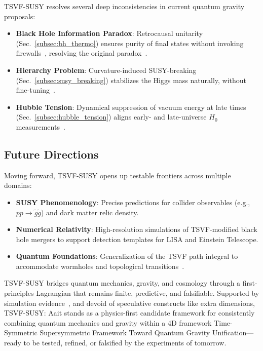 \documentclass[twocolumn,superscriptaddress,floatfix]{revtex4-2}
\begin{document}
TSVF-SUSY resolves several deep inconsistencies in current quantum gravity proposals:
\begin{itemize}
    \item \textbf{Black Hole Information Paradox}: Retrocausal unitarity (Sec.~\ref{subsec:bh_thermo}) ensures purity of final states without invoking firewalls~\cite{Almheiri2013}, resolving the original paradox~\cite{Hawking1976}.
    \item \textbf{Hierarchy Problem}: Curvature-induced SUSY-breaking (Sec.~\ref{subsec:susy_breaking}) stabilizes the Higgs mass naturally, without fine-tuning~\cite{Giudice2008}.
    \item \textbf{Hubble Tension}: Dynamical suppression of vacuum energy at late times (Sec.~\ref{subsec:hubble_tension}) aligns early- and late-universe \(H_0\) measurements~\cite{Riess2021}.
\end{itemize}

\subsection{Future Directions}
\label{subsec:future_directions}

Moving forward, TSVF-SUSY opens up testable frontiers across multiple domains:
\begin{itemize}
    \item \textbf{SUSY Phenomenology}: Precise predictions for collider observables (e.g., \(pp \to \tilde{g}\tilde{g}\)) and dark matter relic density.
    \item \textbf{Numerical Relativity}: High-resolution simulations of TSVF-modified black hole mergers to support detection templates for LISA and Einstein Telescope.
    \item \textbf{Quantum Foundations}: Generalization of the TSVF path integral to accommodate wormholes and topological transitions~\cite{Maldacena2020}.
\end{itemize}

TSVF-SUSY bridges quantum mechanics, gravity, and cosmology through a first-principles Lagrangian that remains finite, predictive, and falsifiable. Supported by simulation evidence~\cite{tsvf-susy-gw,tsvf-susy-darkenergy}, and devoid of speculative constructs like extra dimensions, TSVF-SUSY: Aait stands as a physics-first candidate framework for consistently combining quantum mechanics and gravity within a 4D framework Time-Symmetric Supersymmetric Framework Toward Quantum Gravity Unification—ready to be tested, refined, or falsified by the experiments of tomorrow.
\end{document}
